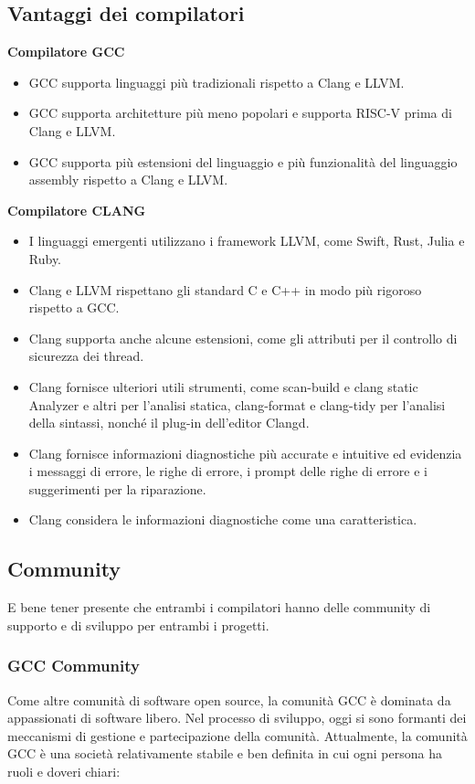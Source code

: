 \documentclass[12pt,a4paper]{report}
\begin{document}
\subsection{Vantaggi dei compilatori}
\textbf{Compilatore GCC}
\begin{itemize}
	\item GCC supporta linguaggi più tradizionali rispetto a Clang e LLVM.
	\item GCC supporta architetture più meno popolari e supporta RISC-V prima di Clang e LLVM.
	\item GCC supporta più estensioni del linguaggio e più funzionalità del linguaggio assembly rispetto a Clang e LLVM.
\end{itemize}
\textbf{Compilatore CLANG}
\begin{itemize}
	\item I linguaggi emergenti utilizzano i framework LLVM, come Swift, Rust, Julia e Ruby.
	\item Clang e LLVM rispettano gli standard C e C++ in modo più rigoroso rispetto a GCC.
	\item Clang supporta anche alcune estensioni, come gli attributi per il controllo di sicurezza dei thread.
	\item Clang fornisce ulteriori utili strumenti, come scan-build e clang static Analyzer e altri per l'analisi statica, clang-format e clang-tidy per l'analisi della sintassi, nonché il plug-in dell'editor Clangd.
	\item Clang fornisce informazioni diagnostiche più accurate e intuitive ed evidenzia i messaggi di errore, le righe di errore, i prompt delle righe di errore e i suggerimenti per la riparazione. 
	\item Clang considera le informazioni diagnostiche come una caratteristica.
\end{itemize}

\subsection{Community}
E bene tener presente che entrambi i compilatori hanno delle community di supporto e di sviluppo per entrambi i progetti. 

\subsubsection{GCC Community}
Come altre comunità di software open source, la comunità GCC è dominata da appassionati di software libero. Nel processo di sviluppo, oggi si sono formanti dei meccanismi di gestione e partecipazione della comunità. Attualmente, la comunità GCC è una società relativamente stabile e ben definita in cui ogni persona ha ruoli e doveri chiari:
\end{document}
